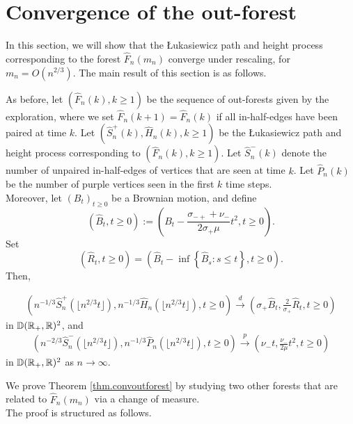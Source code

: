 \section{Convergence of the out-forest}\label{sec.convoutforest}
In this section, we will show that the \L ukasiewicz path and height process corresponding to the forest $\hat{F}_n(m_n)$ converge under rescaling, for $m_n=O(n^{2/3})$. 
The main result of this section is as follows. 

\begin{theorem}\label{thm.convoutforest}
As before, let $(\hat{F}_n(k),k\geq 1)$ be the sequence of out-forests given by the exploration, where we set $\hat{F}_n(k+1)=\hat{F}_n(k)$ if all in-half-edges have been paired at time $k$. Let $(\hat{S}^{+}_n(k),\hat{H}_n(k),k\geq 1)$ be the \L ukasiewicz path and height process corresponding to $(\hat{F}_n(k),k\geq 1)$. Let $\hat{S}^-_n(k)$ denote the number of unpaired in-half-edges of vertices that are seen at time $k$. Let $\hat{P}_n(k)$ be the number of purple vertices seen in the first $k$ time steps. \\
Moreover, let $(B_t)_{t\geq 0}$ be a Brownian motion, and define
$$(\hat{B}_t,t\geq 0):=\left( B_t-\frac{\sigma_{-+}+\nu_-}{2\sigma_+ \mu}t^2, t\geq 0\right).$$ 
Set $$(\hat{R}_t,t\geq 0)= \left(\hat{B}_t-\inf\left\{\hat{B}_s: s\leq t\right\},t\geq 0\right).$$
Then,

\begin{align*}\left(n^{-1/3}\hat{S}^{+}_n\left(\lfloor n^{2/3}t\rfloor \right),n^{-1/3}\hat{H}_{n}\left(\lfloor n^{2/3}t\rfloor \right), t\geq 0\right)
\overset{d}{\to}\left(\sigma_+ \hat{B}_t, \frac{2}{\sigma_+} \hat{R}_t, t\geq 0\right)\end{align*}
in ${\mathbb D}({\mathbb R}_+,{\mathbb R})^2$, and 
\begin{align*}\left( n^{-2/3}\hat{S}_n^-\left(\lfloor n^{2/3}t\rfloor \right), n^{-1/3}\hat{P}_n\left(\lfloor n^{2/3}t\rfloor \right), t\geq 0\right)\overset{p}{\to}\left(\nu_-t,  \frac{\nu_-}{2\mu} t^2, t\geq 0\right)\end{align*}
in ${\mathbb D}({\mathbb R}_+,{\mathbb R})^2$ as $n\to \infty$. 
\end{theorem}
We prove Theorem \ref{thm.convoutforest} by studying two other forests that are related to $\hat{F}_n(m_n)$ via a change of measure.  \\
The proof is structured as follows.
